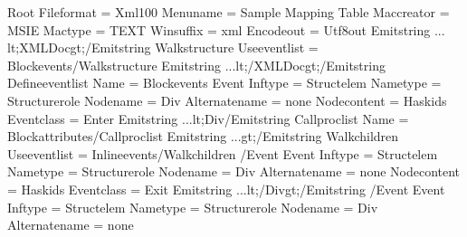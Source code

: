 \documentclass[letterpaper,12pt,english,openany,oneside]{sphinxmanual}
\begin{document}
\begin{sphinxVerbatim}[commandchars=\\\{\}]
\PYGZlt{}Root File\PYGZhy{}format = \PYGZdq{}Xml\PYGZhy{}1\PYGZhy{}00\PYGZdq{} Menu\PYGZhy{}name = \PYGZdq{}Sample Mapping Table\PYGZdq{}
      Mac\PYGZhy{}creator = \PYGZdq{}MSIE\PYGZdq{} Mac\PYGZhy{}type = \PYGZdq{}TEXT\PYGZdq{} Win\PYGZhy{}suffix = \PYGZdq{}xml\PYGZdq{}
      Encode\PYGZhy{}out = \PYGZdq{}Utf\PYGZhy{}8\PYGZhy{}out\PYGZdq{}\PYGZgt{}
  \PYGZlt{}Emit\PYGZhy{}string ... \PYGZgt{}\PYGZam{}lt;XML\PYGZhy{}Doc\PYGZam{}gt;\PYGZlt{}/Emit\PYGZhy{}string\PYGZgt{}
  \PYGZlt{}Walk\PYGZhy{}structure Use\PYGZhy{}event\PYGZhy{}list = \PYGZdq{}Block\PYGZhy{}events\PYGZdq{}\PYGZgt{}\PYGZlt{}/Walk\PYGZhy{}structure\PYGZgt{}
  \PYGZlt{}Emit\PYGZhy{}string ...\PYGZgt{}\PYGZam{}lt;/XML\PYGZhy{}Doc\PYGZam{}gt;\PYGZlt{}/Emit\PYGZhy{}string\PYGZgt{}
  \PYGZlt{}Define\PYGZhy{}event\PYGZhy{}list Name = \PYGZdq{}Block\PYGZhy{}events\PYGZdq{}\PYGZgt{}
    \PYGZlt{}Event  Inf\PYGZhy{}type = \PYGZdq{}Struct\PYGZhy{}elem\PYGZdq{} Name\PYGZhy{}type = \PYGZdq{}Structure\PYGZhy{}role\PYGZdq{}
            Node\PYGZhy{}name = \PYGZdq{}Div\PYGZdq{} Alternate\PYGZhy{}name = \PYGZdq{}\PYGZhy{}none\PYGZhy{}\PYGZdq{}
            Node\PYGZhy{}content = \PYGZdq{}Has\PYGZhy{}kids\PYGZdq{} Event\PYGZhy{}class = \PYGZdq{}Enter\PYGZdq{}\PYGZgt{}
      \PYGZlt{}Emit\PYGZhy{}string ...\PYGZgt{}\PYGZam{}lt;Div\PYGZlt{}/Emit\PYGZhy{}string\PYGZgt{}
      \PYGZlt{}Call\PYGZhy{}proc\PYGZhy{}list Name = \PYGZdq{}Block\PYGZhy{}attributes\PYGZdq{}\PYGZgt{}\PYGZlt{}/Call\PYGZhy{}proc\PYGZhy{}list\PYGZgt{}
      \PYGZlt{}Emit\PYGZhy{}string ...\PYGZgt{}\PYGZam{}gt;\PYGZlt{}/Emit\PYGZhy{}string\PYGZgt{}
      \PYGZlt{}Walk\PYGZhy{}children Use\PYGZhy{}event\PYGZhy{}list = \PYGZdq{}Inline\PYGZhy{}events\PYGZdq{}\PYGZgt{}\PYGZlt{}/Walk\PYGZhy{}children\PYGZgt{}
    \PYGZlt{}/Event\PYGZgt{}
      \PYGZlt{}Event  Inf\PYGZhy{}type = \PYGZdq{}Struct\PYGZhy{}elem\PYGZdq{} Name\PYGZhy{}type = \PYGZdq{}Structure\PYGZhy{}role\PYGZdq{}
              Node\PYGZhy{}name = \PYGZdq{}Div\PYGZdq{} Alternate\PYGZhy{}name = \PYGZdq{}\PYGZhy{}none\PYGZhy{}\PYGZdq{}
              Node\PYGZhy{}content = \PYGZdq{}Has\PYGZhy{}kids\PYGZdq{} Event\PYGZhy{}class = \PYGZdq{}Exit\PYGZdq{}\PYGZgt{}
      \PYGZlt{}Emit\PYGZhy{}string ...\PYGZgt{}\PYGZam{}lt;/Div\PYGZam{}gt;\PYGZlt{}/Emit\PYGZhy{}string\PYGZgt{}
    \PYGZlt{}/Event\PYGZgt{}
    \PYGZlt{}Event  Inf\PYGZhy{}type = \PYGZdq{}Struct\PYGZhy{}elem\PYGZdq{} Name\PYGZhy{}type = \PYGZdq{}Structure\PYGZhy{}role\PYGZdq{}
            Node\PYGZhy{}name = \PYGZdq{}Div\PYGZdq{} Alternate\PYGZhy{}name = \PYGZdq{}\PYGZhy{}none\PYGZhy{}\PYGZdq{}

\end{sphinxVerbatim}
\end{document}
